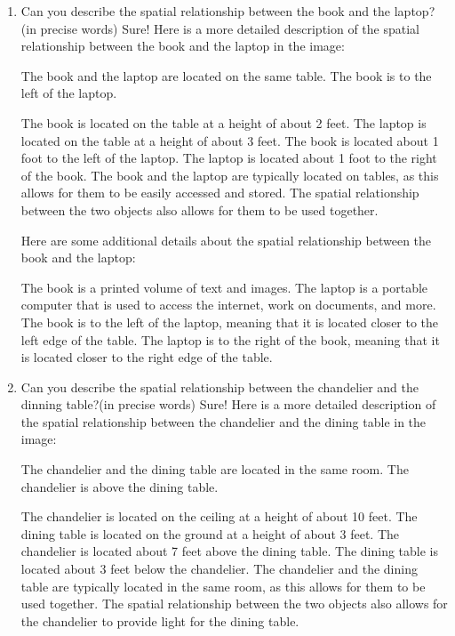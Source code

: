 \begin{enumerate}
    \item Can you describe the spatial relationship between the book and the laptop?(in precise words)
    \subitem 
    Sure! Here is a more detailed description of the spatial relationship between the book and the laptop in the image:
    
    The book and the laptop are located on the same table. The book is to the left of the laptop.
    
    The book is located on the table at a height of about 2 feet.
    The laptop is located on the table at a height of about 3 feet.
    The book is located about 1 foot to the left of the laptop.
    The laptop is located about 1 foot to the right of the book.
    The book and the laptop are typically located on tables, as this allows for them to be easily accessed and stored. The spatial relationship between the two objects also allows for them to be used together.
    
    Here are some additional details about the spatial relationship between the book and the laptop:
    
    The book is a printed volume of text and images.
    The laptop is a portable computer that is used to access the internet, work on documents, and more.
    The book is to the left of the laptop, meaning that it is located closer to the left edge of the table.
    The laptop is to the right of the book, meaning that it is located closer to the right edge of the table.
    \item Can you describe the spatial relationship between the chandelier and the dinning table?(in precise words)
    \subitem Sure! Here is a more detailed description of the spatial relationship between the chandelier and the dining table in the image:

    The chandelier and the dining table are located in the same room. The chandelier is above the dining table.
    
    The chandelier is located on the ceiling at a height of about 10 feet.
    The dining table is located on the ground at a height of about 3 feet.
    The chandelier is located about 7 feet above the dining table.
    The dining table is located about 3 feet below the chandelier.
    The chandelier and the dining table are typically located in the same room, as this allows for them to be used together. The spatial relationship between the two objects also allows for the chandelier to provide light for the dining table.
    

\end{enumerate}
